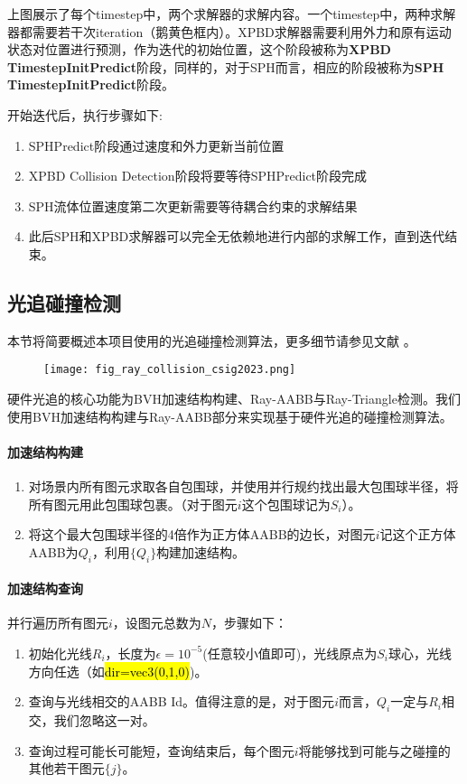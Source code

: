 上图展示了每个timestep中，两个求解器的求解内容。一个timestep中，两种求解器都需要若干次iteration（鹅黄色框内）。XPBD求解器需要利用外力和原有运动状态对位置进行预测，作为迭代的初始位置，这个阶段被称为\textbf{XPBD TimestepInitPredict}阶段，同样的，对于SPH而言，相应的阶段被称为\textbf{SPH TimestepInitPredict}阶段。

开始迭代后，执行步骤如下:
\begin{enumerate}
	\item SPHPredict阶段通过速度和外力更新当前位置
	\item XPBD Collision Detection阶段将要等待SPHPredict阶段完成
	\item SPH流体位置速度第二次更新需要等待耦合约束的求解结果
	\item 此后SPH和XPBD求解器可以完全无依赖地进行内部的求解工作，直到迭代结束。
\end{enumerate}
\subsection{光追碰撞检测}
本节将简要概述本项目使用的光追碰撞检测算法，更多细节请参见文献 \cite{rtCollision2022}。

\begin{figure}[H]
	\centering
	\texttt{[image: fig\_ray\_collision\_csig2023.png]}
\end{figure}

硬件光追的核心功能为BVH加速结构构建、Ray-AABB与Ray-Triangle检测。我们使用BVH加速结构构建与Ray-AABB部分来实现基于硬件光追的碰撞检测算法。
\paragraph{加速结构构建}
\begin{enumerate}
	\item 对场景内所有图元求取各自包围球，并使用并行规约找出最大包围球半径，将所有图元用此包围球包裹。（对于图元$i$这个包围球记为$S_i$）。
	\item 将这个最大包围球半径的4倍作为正方体AABB的边长，对图元$i$记这个正方体AABB为$Q_i$，利用$\{Q_i\}$构建加速结构。
\end{enumerate}
\paragraph{加速结构查询} 并行遍历所有图元$i$，设图元总数为$N$，步骤如下：
\begin{enumerate}
	\item 初始化光线$R_i$，长度为$\epsilon=10^{-5}$(任意较小值即可)，光线原点为$S_i$球心，光线方向任选（如\hl{dir=vec3(0,1,0)})。
	\item 查询与光线相交的AABB Id。值得注意的是，对于图元$i$而言，$Q_i$一定与$R_i$相交，我们忽略这一对。
	\item 查询过程可能长可能短，查询结束后，每个图元$i$将能够找到可能与之碰撞的其他若干图元$\{j\}$。
\end{enumerate}
